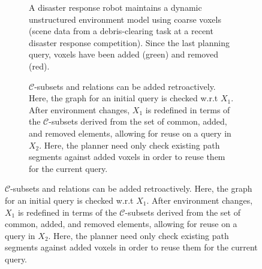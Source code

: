\documentclass{report}
\begin{document}
\begin{figure}
\centering

\begin{subfigure}[b]{\linewidth}
\centering
{}
\caption{A disaster response robot maintains a
  dynamic unstructured environment model
  using coarse voxels
  (scene data from a debris-clearing task at a
  recent disaster response competition).
  Since the last planning query,
  voxels have been added (green) and removed (red).}
\label{fig:chimp-voxels-delta}
\end{subfigure}

\vspace{0.1in}

\begin{subfigure}[b]{\linewidth}
\centering


\caption{
  $\mathcal{C}$-subsets and relations
  can be added retroactively.
  Here, the graph for an initial query is checked w.r.t $X_1$.
  After environment changes,
  $X_1$ is redefined in terms of the $\mathcal{C}$-subsets
  derived from the set of common, added, and removed elements,
  allowing for reuse on a query in $X_2$.
  Here,
  the planner need only check existing path segments
  against added voxels in order to reuse them for the current query.}
\label{fig:retroactive}
\end{subfigure}


\end{figure}
\end{document}
